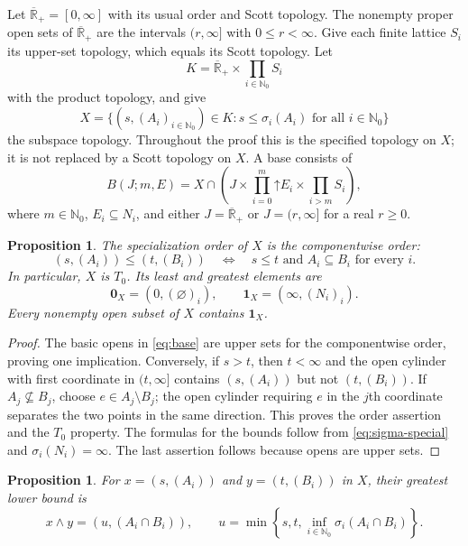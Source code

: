 \documentclass[11pt]{amsart}
\newtheorem{proposition}[theorem]{Proposition}
\theoremstyle{definition}
\theoremstyle{remark}
\numberwithin{equation}{section}
\newcommand{\NN}{\mathbb N}
\newcommand{\RR}{\overline{\mathbb R}_{+}}
\newcommand{\up}{\mathord\uparrow}
\newcommand{\tops}{\mathbf 1_X}
\newcommand{\bots}{\mathbf 0_X}
\begin{document}
Let $\RR=[0,\infty]$ with its usual order and Scott topology.
The nonempty proper open sets of $\RR$ are the intervals
$(r,\infty]$ with $0\leq r<\infty$. Give each finite lattice $S_i$
its upper-set topology, which equals its Scott topology. Let
\begin{equation}\label{eq:ambient}
K=\RR\times\prod_{i\in\NN_0}S_i
\end{equation}
with the product topology, and give
\begin{equation}\label{eq:X}
X=\{(s,(A_i)_{i\in\NN_0})\in K:
                         s\leq\sigma_i(A_i)\text{ for all }i\in\NN_0\}
\end{equation}
the subspace topology. Throughout the proof this is the specified
topology on $X$; it is not replaced by a Scott topology on $X$.
A base consists of
\begin{equation}\label{eq:base}
B(J;m,E)=X\cap
 \left(J\times\prod_{i=0}^{m}\up E_i\times\prod_{i>m}S_i\right),
\end{equation}
where $m\in\NN_0$, $E_i\subseteq N_i$, and either $J=\RR$ or
$J=(r,\infty]$ for a real $r\geq0$.

\begin{proposition}\label{prop:order}
The specialization order of $X$ is the componentwise order:
\[
(s,(A_i))\leq(t,(B_i))
\quad\Longleftrightarrow\quad s\leq t\text{ and }A_i\subseteq B_i
\text{ for every }i.
\]
In particular, $X$ is $T_0$. Its least and greatest elements are
\[
\bots=(0,(\varnothing)_i),\qquad
\tops=(\infty,(N_i)_i).
\]
Every nonempty open subset of $X$ contains $\tops$.
\end{proposition}

\begin{proof}
The basic opens in \eqref{eq:base} are upper sets for the
componentwise order, proving one implication. Conversely, if $s>t$,
then $t<\infty$ and the open cylinder with first coordinate in
$(t,\infty]$ contains $(s,(A_i))$ but not $(t,(B_i))$.
If $A_j\nsubseteq B_j$, choose $e\in A_j\setminus B_j$; the open
cylinder requiring $e$ in the $j$th coordinate separates the two
points in the same direction. This proves the order assertion and
the $T_0$ property. The formulas for the bounds follow from
\eqref{eq:sigma-special} and $\sigma_i(N_i)=\infty$.
The last assertion follows because opens are upper sets.
\end{proof}

\begin{proposition}\label{prop:meet}
For $x=(s,(A_i))$ and $y=(t,(B_i))$ in $X$, their greatest lower
bound is
\begin{equation}\label{eq:meet}
x\wedge y=(u,(A_i\cap B_i)),\qquad
u=\min\left\{s,t,\inf_{i\in\NN_0}\sigma_i(A_i\cap B_i)\right\}.
\end{equation}
\end{proposition}
\end{document}
